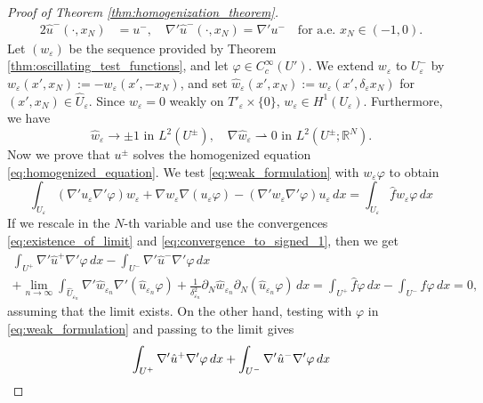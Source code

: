 \documentclass{article}
\numberwithin{equation}{section}
\theoremstyle{definition}
\theoremstyle{remark}
\begin{document}
\begin{proof}[Proof of Theorem \ref{thm:homogenization_theorem}]
\begin{alignat*}{2}
        \hat{u}^-(\cdot, x_N) &= u^-, \quad \nabla' \hat{u}^-(\cdot, x_N) = \nabla' u^- \quad \text{for a.e. } x_N \in (-1, 0).
    \end{alignat*}
    Let $(w_\varepsilon)$ be the sequence provided by Theorem \ref{thm:oscillating_test_functions}, and let $\varphi \in C_c^\infty(U')$. We extend $w_\varepsilon$ to $U_\varepsilon^-$ by $w_\varepsilon(x', x_N) := -w_\varepsilon(x', -x_N)$, and set $\hat{w}_\varepsilon(x', x_N) := w_\varepsilon(x', \delta_\varepsilon x_N)$ for $(x', x_N) \in \hat{U}_\varepsilon$. Since $w_\varepsilon = 0$ weakly on $T'_\varepsilon \times \{0\}$, $w_\varepsilon \in H^1(U_\varepsilon)$. Furthermore, we have
    \begin{equation} \label{eq:convergence_to_signed_1}
        \hat{w}_\varepsilon \to \pm 1 \text{ in } L^2(U^\pm), \quad \nabla \hat{w}_\varepsilon \rightharpoonup 0 \text{ in } L^2(U^\pm; \mathbb{R}^N).
    \end{equation}
    Now we prove that $u^\pm$ solves the homogenized equation \eqref{eq:homogenized_equation}. We test \eqref{eq:weak_formulation} with $w_\varepsilon \varphi$ to obtain
    \begin{equation*}
        \int_{U_\varepsilon} (\nabla' u_\varepsilon \nabla' \varphi) w_\varepsilon + \nabla w_\varepsilon \nabla ( u_\varepsilon \varphi) - (\nabla' w_\varepsilon \nabla' \varphi) u_\varepsilon \, dx = \int_{U_\varepsilon} \hat{f} w_\varepsilon \varphi \, dx
    \end{equation*}
    If we rescale in the $N$-th variable and use the convergences \eqref{eq:existence_of_limit} and \eqref{eq:convergence_to_signed_1}, then we get
    \begin{multline} \label{eq:testing_testing}
        \int_{U^+} \nabla' \hat{u}^+ \nabla' \varphi \, dx - \int_{U^-} \nabla' \hat{u}^- \nabla' \varphi \, dx \\
        + \lim_{n \to \infty} \int_{\hat{U}_{\varepsilon_n}} \nabla' \hat{w}_{\varepsilon_n} \nabla' (\hat{u}_{\varepsilon_n} \varphi) + \frac{1}{\delta_{\varepsilon_n}^2} \partial_N \hat{w}_{\varepsilon_n} \partial_N (\hat{u}_{\varepsilon_n} \varphi) \, dx = \int_{U^+} \hat{f} \varphi \, dx - \int_{U^-} \hat{f} \varphi \, dx = 0,
    \end{multline}
    assuming that the limit exists. On the other hand, testing with $\varphi$ in \eqref{eq:weak_formulation} and passing to the limit gives
    \begin{equation} \label{eq:easy_limit}
        \int_{U^+} \nabla' \hat{u}^+ \nabla' \varphi \, dx + \int_{U^-} \nabla' \hat{u}^- \nabla' \varphi \, dx \\

\end{equation}
\end{proof}
\end{document}
